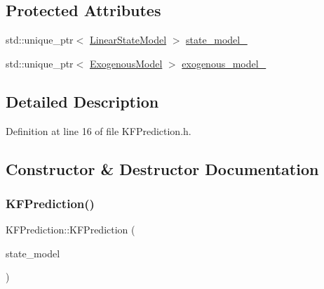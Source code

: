 \subsection*{Protected Attributes}
\begin{DoxyCompactItemize}
\item 
std\+::unique\+\_\+ptr$<$ \mbox{\hyperlink{classbfl_1_1LinearStateModel}{Linear\+State\+Model}} $>$ \mbox{\hyperlink{classbfl_1_1KFPrediction_ab3230d88e673642feced141b05c2a804}{state\+\_\+model\+\_\+}}
\item 
std\+::unique\+\_\+ptr$<$ \mbox{\hyperlink{classbfl_1_1ExogenousModel}{Exogenous\+Model}} $>$ \mbox{\hyperlink{classbfl_1_1KFPrediction_a3b862c03224b94a323dd4d3d60a65622}{exogenous\+\_\+model\+\_\+}}
\end{DoxyCompactItemize}


\subsection{Detailed Description}


Definition at line 16 of file K\+F\+Prediction.\+h.



\subsection{Constructor \& Destructor Documentation}
\mbox{\label{classbfl_1_1KFPrediction_a91e58a83fceb6fe2ec6ef9221ac1eef9}} 
\subsubsection{\texorpdfstring{K\+F\+Prediction()}{KFPrediction()}\hspace{0.1cm}{\footnotesize\ttfamily [1/3]}}
{\footnotesize\ttfamily K\+F\+Prediction\+::\+K\+F\+Prediction (\begin{DoxyParamCaption}\item[{std\+::unique\+\_\+ptr$<$ \mbox{\hyperlink{classbfl_1_1LinearStateModel}{Linear\+State\+Model}} $>$}]{state\+\_\+model }\end{DoxyParamCaption})\hspace{0.3cm}{\ttfamily [noexcept]}}




